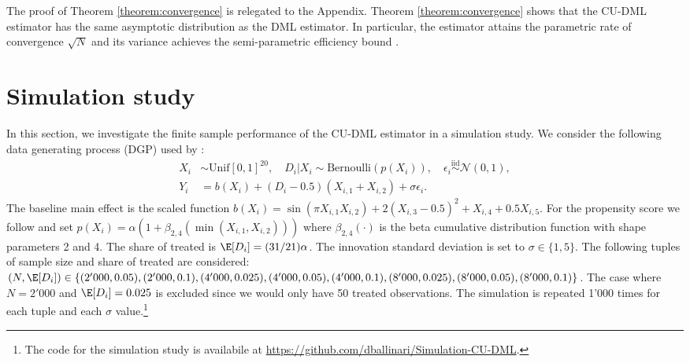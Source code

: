 The proof of Theorem \ref{theorem:convergence} is relegated to the Appendix. Theorem \ref{theorem:convergence} shows that the CU-DML estimator has the same asymptotic distribution as the DML estimator. In particular, the estimator attains the parametric rate of convergence $\sqrt{N}$ and its variance achieves the semi-parametric efficiency bound \citep{Hahn1998}.

\section{Simulation study}
In this section, we investigate the finite sample performance of the CU-DML estimator in a simulation study. We consider the following data generating process (DGP) used by \cite{Nie2020}:
\begin{align*}
    X_i &\sim \text{Unif}[0,1]^{20}, \quad D_i \vert X_i \sim \text{Bernoulli}\left(p(X_i)\right), \quad \epsilon_i \overset{\text{iid}}{\sim} \mathcal{N}(0,1),\\
    Y_i &= b(X_i) + (D_i-0.5) \left(X_{i,1} + X_{i,2}\right) + \sigma \epsilon_i.
\end{align*}
The baseline main effect is the scaled \cite{Friedman1991} function $b(X_i) = \sin\left(\pi X_{i,1}X_{i,2}\right) + 2\left(X_{i,3}-0.5\right)^2 + X_{i,4}+ 0.5X_{i,5}$. For the propensity score we follow \cite{Kunzel2019} and set $p(X_i) = \alpha \left(1+\beta_{2,4}\left(\min(X_{i,1},X_{i,2}) \right)\right)$ where $\beta_{2,4}(\cdot)$ is the beta cumulative distribution function with shape parameters 2 and 4. The share of treated is $\E[D_i] = (31/21) \alpha$. The innovation standard deviation is set to $\sigma \in \{1, 5\}$. The following tuples of sample size and share of treated are considered: $\left(N, \E[D_i]\right) \in \{(2'000, 0.05), (2'000, 0.1), (4'000, 0.025), (4'000, 0.05),(4'000, 0.1), (8'000, 0.025), (8'000, 0.05), (8'000, 0.1)\}$. The case where $N=2'000$ and $\E[D_i]=0.025$ is excluded since we would only have 50 treated observations. The simulation is repeated 1'000 times for each tuple and each $\sigma$ value.\footnote{The code for the simulation study is availabile at \url{https://github.com/dballinari/Simulation-CU-DML}.}

